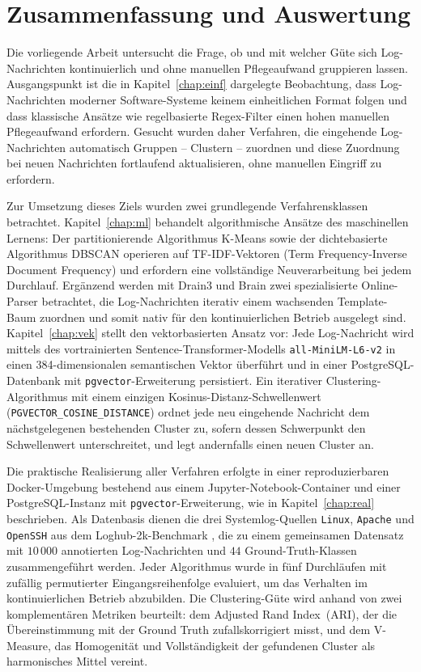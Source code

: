 \chapter{Zusammenfassung und Auswertung}
\label{chap:abschluss}

Die vorliegende Arbeit untersucht die Frage, ob und mit welcher Güte sich Log-Nachrichten kontinuierlich und ohne manuellen Pflegeaufwand gruppieren lassen. Ausgangspunkt ist die in Kapitel~\ref{chap:einf} dargelegte Beobachtung, dass Log-Nachrichten moderner Software-Systeme keinem einheitlichen Format folgen und dass klassische Ansätze wie regelbasierte Regex-Filter einen hohen manuellen Pflegeaufwand erfordern. Gesucht wurden daher Verfahren, die eingehende Log-Nachrichten automatisch Gruppen -- Clustern -- zuordnen und diese Zuordnung bei neuen Nachrichten fortlaufend aktualisieren, ohne manuellen Eingriff zu erfordern.

Zur Umsetzung dieses Ziels wurden zwei grundlegende Verfahrensklassen betrachtet. Kapitel~\ref{chap:ml} behandelt algorithmische Ansätze des maschinellen Lernens: Der partitionierende Algorithmus K-Means sowie der dichtebasierte Algorithmus DBSCAN operieren auf TF-IDF-Vektoren (Term Frequency-Inverse Document Frequency) und erfordern eine vollständige Neuverarbeitung bei jedem Durchlauf. Ergänzend werden mit Drain3 und Brain zwei spezialisierte Online-Parser betrachtet, die Log-Nachrichten iterativ einem wachsenden Template-Baum zuordnen und somit nativ für den kontinuierlichen Betrieb ausgelegt sind. Kapitel~\ref{chap:vek} stellt den vektorbasierten Ansatz vor: Jede Log-Nachricht wird mittels des vortrainierten Sentence-Transformer-Modells \texttt{all-MiniLM-L6-v2} in einen 384-dimensionalen semantischen Vektor überführt und in einer PostgreSQL-Datenbank mit \texttt{pgvector}-Erweiterung persistiert. Ein iterativer Clustering-Algorithmus mit einem einzigen Kosinus-Distanz-Schwellenwert (\texttt{PGVECTOR\_COSINE\_DISTANCE}) ordnet jede neu eingehende Nachricht dem nächstgelegenen bestehenden Cluster zu, sofern dessen Schwerpunkt den Schwellenwert unterschreitet, und legt andernfalls einen neuen Cluster an.

Die praktische Realisierung aller Verfahren erfolgte in einer reproduzierbaren Docker-Umgebung bestehend aus einem Jupyter-Notebook-Container und einer PostgreSQL-Instanz mit \texttt{pgvector}-Erweiterung, wie in Kapitel~\ref{chap:real} beschrieben. Als Datenbasis dienen die drei Systemlog-Quellen \texttt{Linux}, \texttt{Apache} und \texttt{OpenSSH} aus dem Loghub-2k-Benchmark \cite{zhu2023loghublargecollectionlog}, die zu einem gemeinsamen Datensatz mit $10\,000$ annotierten Log-Nachrichten und $44$ Ground-Truth-Klassen zusammengeführt werden. Jeder Algorithmus wurde in fünf Durchläufen mit zufällig permutierter Eingangsreihenfolge evaluiert, um das Verhalten im kontinuierlichen Betrieb abzubilden. Die Clustering-Güte wird anhand von zwei komplementären Metriken beurteilt: dem Adjusted Rand Index~(ARI), der die Übereinstimmung mit der Ground Truth zufallskorrigiert misst, und dem V-Measure, das Homogenität und Vollständigkeit der gefundenen Cluster als harmonisches Mittel vereint.

